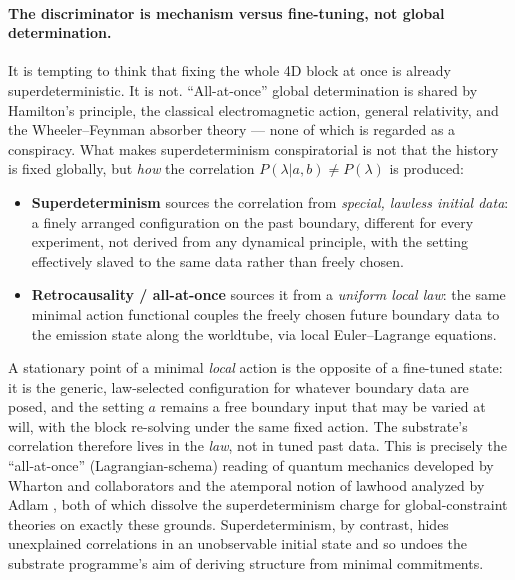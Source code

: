 \paragraph{The discriminator is mechanism versus fine-tuning, not global determination.}
It is tempting to think that fixing the whole 4D block at once is already superdeterministic.
It is not. ``All-at-once'' global determination is shared by Hamilton's principle, the classical
electromagnetic action, general relativity, and the Wheeler--Feynman absorber theory --- none of
which is regarded as a conspiracy.
What makes superdeterminism conspiratorial is not that the history is fixed globally, but
\emph{how} the correlation $P(\lambda|a,b)\neq P(\lambda)$ is produced:
\begin{itemize}
  \item \textbf{Superdeterminism} sources the correlation from \emph{special, lawless initial
  data}: a finely arranged configuration on the past boundary, different for every experiment,
  not derived from any dynamical principle, with the setting effectively slaved to the same data
  rather than freely chosen.
  \item \textbf{Retrocausality / all-at-once} sources it from a \emph{uniform local law}: the
  same minimal action functional couples the freely chosen future boundary data to the emission
  state along the worldtube, via local Euler--Lagrange equations.
\end{itemize}
A stationary point of a minimal \emph{local} action is the opposite of a fine-tuned state: it is
the generic, law-selected configuration for whatever boundary data are posed, and the setting
$a$ remains a free boundary input that may be varied at will, with the block re-solving under the
same fixed action.
The substrate's correlation therefore lives in the \emph{law}, not in tuned past data.
This is precisely the ``all-at-once'' (Lagrangian-schema) reading of quantum mechanics developed
by Wharton and collaborators \citep{Wharton2015NotAComputer,WhartonArgaman2020} and the atemporal
notion of lawhood analyzed by Adlam \citep{Adlam2018SpookyTemporal}, both of which dissolve the
superdeterminism charge for global-constraint theories on exactly these grounds.
Superdeterminism, by contrast, hides unexplained correlations in an unobservable initial state
\citep{Hossenfelder2020Superdeterminism} and so undoes the substrate programme's aim of deriving
structure from minimal commitments.

